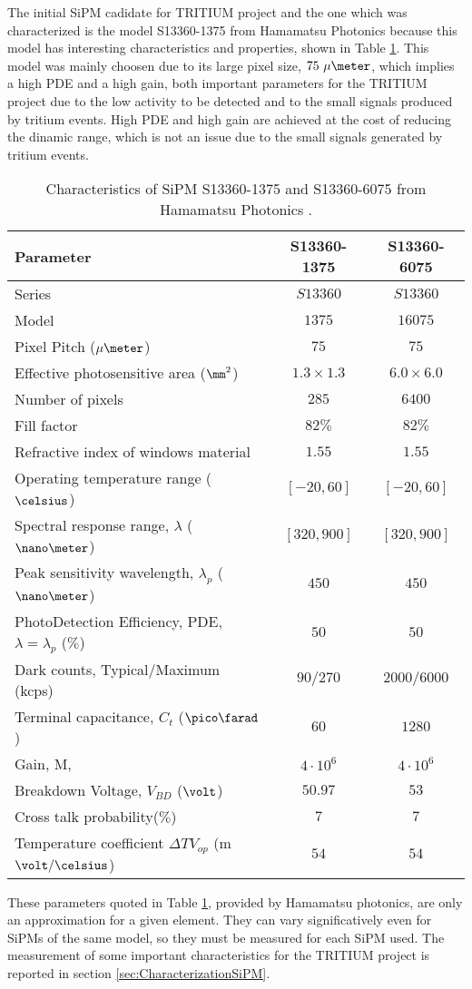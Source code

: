 The initial SiPM cadidate for TRITIUM project and the one which was characterized is the model S13360-1375 from Hamamatsu Photonics \cite{DataSheetHammamatsu_1_SiPM_1375} because this model has interesting characteristics and properties, shown in Table \ref{tab:PropertiesOfSiPM1375}. This model was mainly choosen due to its large pixel size, $75~\mu\meter$, which implies a high PDE and a high gain, both important parameters for the TRITIUM project due to the low activity to be detected and to the small signals produced by tritium events. High PDE and high gain are achieved at the cost of reducing the dinamic range, which is not an issue due to the small signals generated by tritium events. 

\begin{table}[htbp]
\centering{}%
\begin{tabular}{lcc}
\toprule 
Parameter & S13360-1375 & S13360-6075 \tabularnewline
\midrule
\midrule 
Series & $S13360$ & $S13360$ \tabularnewline
Model & $1375$ & $16075$ \tabularnewline
Pixel Pitch ($\mu\meter$) & $75$ & $75$ \tabularnewline
Effective photosensitive area ($\mm^2$) & $1.3 \times 1.3$ & $6.0 \times 6.0$ \tabularnewline
Number of pixels & $285$ & $6400$ \tabularnewline
Fill factor & $82\%$ & $82\%$ \tabularnewline
Refractive index of windows material & $1.55$ & $1.55$ \tabularnewline
Operating temperature range ($\celsius$) & $[-20,60]$ & $[-20,60]$ \tabularnewline
Spectral response range, $\lambda$ ($\nano\meter$) & $[320, 900]$ & $[320, 900]$ \tabularnewline
Peak sensitivity wavelength, $\lambda_p$ ($\nano\meter$) & $450$ & $450$ \tabularnewline
PhotoDetection Efficiency, PDE, $\lambda=\lambda_p$ ($\%$) & $50$ & $50$ \tabularnewline
Dark counts, Typical/Maximum (kcps) & $90/270$ & $2000/6000$ \tabularnewline
Terminal capacitance, $C_t$ ($\pico\farad$) & $60$ & $1280$ \tabularnewline
Gain, M, & $4 \cdot{} 10^6$ & $4 \cdot{} 10^6$ \tabularnewline
Breakdown Voltage, $V_{BD}$ ($\volt$) & $50.97$ & $53$ \tabularnewline
Cross talk probability($\%$) & $7$ & $7$ \tabularnewline
Temperature coefficient $\Delta TV_{op}$ (m$\volt/\celsius$) & $54$ & $54$ \tabularnewline
\bottomrule
\end{tabular}
\caption{Characteristics of SiPM S13360-1375 and S13360-6075 from Hamamatsu Photonics \cite{DataSheetHammamatsu_1_SiPM_1375}.}
\label{tab:PropertiesOfSiPM1375}
\end{table}

These parameters quoted in Table \ref{tab:PropertiesOfSiPM1375}, provided by Hamamatsu photonics, are only an approximation for a given element. They can vary significatively even for SiPMs of the same model, so they must be measured for each SiPM used. The measurement of some important characteristics for the TRITIUM project is reported in section \ref{sec:CharacterizationSiPM}. 

